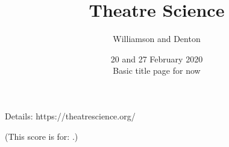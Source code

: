 \documentclass[11pt]{article}
\title{Theatre Science}
\author{Williamson and Denton}
\date{20 and 27 February 2020\\Basic title page for now}
\begin{document}
\maketitle

\vfill

Details: https://theatrescience.org/

\ccby

(This score is for: \textbf{\speaker}.)



\newpage

\tableofcontents

\newpage


\end{document}
